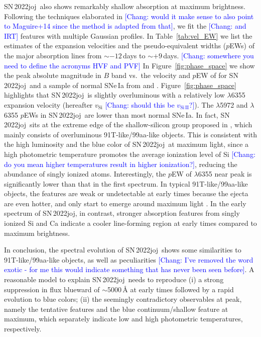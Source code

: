 \documentclass[twocolumn]{aastex631}
\newcommand{\sn}{SN\,2022joj}
\newcommand{\chang}[1]{\textcolor{blue}{[Chang: #1]}}
\begin{document}
\begin{CJK*}{UTF8}{gbsn}
\sn\ also shows remarkably shallow  absorption at maximum brightness. Following the techniques elaborated in \citet{Liu_20jgb_2023} \chang{would it make sense to also point to Maguire+14 since the method is adapted from that}, we fit the  \chang{and  IRT} features with multiple Gaussian profiles. In Table~\ref{tab:vel_EW} we list the estimates of the expansion velocities and the pseudo-equivalent widths ($p$EWs) of the major absorption lines from $\sim$$-12$\,days to $\sim$$+9$\,days. \chang{somewhere you need to define the acronyms HVF and PVF} In Figure~\ref{fig:phase_space} we show the peak absolute magnitude in $B$ band vs.\ the velocity and $p$EW of  for \sn\ and a sample of normal SNe\,Ia from \citet{Zheng_2018} and \citet{Burrow_2020}. Figure~\ref{fig:phase_space} highlights that \sn\ is slightly overluminous with a relatively low  $\lambda$6355 expansion velocity (hereafter $v_\mathrm{Si}$ \chang{should this be $v_\mathrm{Si\,II}$?}). The  $\lambda$5972 and  $\lambda$6355 $p$EWs in \sn\ are lower than most normal SNe\,Ia. In fact, \sn\ sits at the extreme edge of the shallow-silicon group proposed in \citet{Branch_2006}, which mainly consists of overluminous 91T-like/99aa-like objects. This is consistent with the high luminosity and the blue color of \sn\ at maximum light, since a high photometric temperature promotes the average ionization level of Si \chang{do you mean higher temperatures result in higher ionization?}, reducing the abundance of singly ionized atoms. Interestingly, the $p$EW of  $\lambda$6355 near peak is significantly lower than that in the first spectrum. In typical 91T-like/99aa-like objects, the  features are weak or undetectable at early times because the ejecta are even hotter, and only start to emerge around maximum light \citep{Filippenko_91T_1992}. In the early spectrum of \sn, in contrast, stronger absorption features from singly ionized Si and Ca indicate a cooler line-forming region at early times compared to maximum brightness. 

In conclusion, the spectral evolution of \sn\ shows some similarities to 91T-like/99aa-like objects, as well as peculiarities \chang{I've removed the word exotic - for me this would indicate something that has never been seen before}. A reasonable model to explain \sn\ needs to reproduce (i) a strong suppression in flux blueward of $\sim$5000\,\r{A} at early times followed by a rapid evolution to blue colors; (ii) the seemingly contradictory observables at peak, namely the tentative  features and the blue continuum/shallow  feature at maximum, which separately indicate low and high photometric temperatures, respectively.


\end{CJK*}
\end{document}
